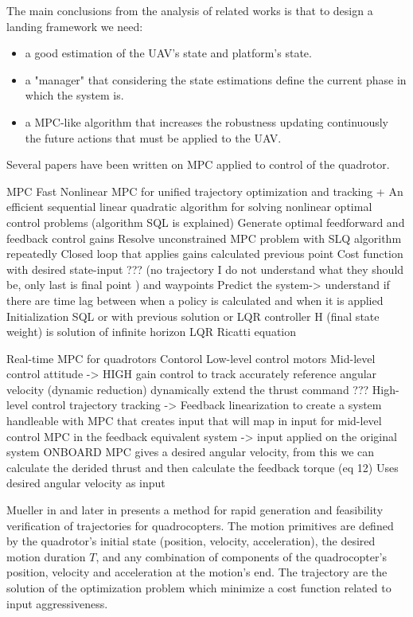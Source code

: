 The main conclusions from the analysis of related works is that to design a landing framework we need:
\begin{itemize}
\item a good estimation of the UAV's state and platform's state.
\item a "manager" that considering the state estimations define the current phase in which the system is.
\item a MPC-like algorithm that increases the robustness updating continuously the future actions that must be applied to the UAV.
\end{itemize}



Several papers have been written on MPC \cite{camacho2013model} applied to control of the quadrotor.



MPC
Fast Nonlinear MPC for unified trajectory optimization and tracking 
+
An efficient sequential linear quadratic algorithm for solving nonlinear optimal control problems (algorithm SQL is explained)
Generate optimal feedforward and feedback control gains
Resolve unconstrained MPC problem with SLQ algorithm repeatedly
Closed loop that applies gains calculated previous point
Cost function with desired state-input ??? (no trajectory I do not understand what they should be, only last is final point )  and waypoints
Predict the system-> understand if there are time lag between when a policy is calculated and when it is applied
Initialization SQL or with previous solution or LQR controller 
H (final state weight) is solution of infinite horizon LQR Ricatti equation



Real-time MPC for quadrotors
Contorol
Low-level control motors
Mid-level control attitude -> HIGH gain control to track accurately reference angular velocity (dynamic reduction) dynamically extend the thrust command ???
High-level control trajectory tracking -> Feedback linearization to create a system handleable  with MPC that creates input that will map in input for mid-level control
MPC in the feedback equivalent system -> input applied on the original system
ONBOARD
MPC gives a desired angular velocity, from this we can calculate the derided thrust and then calculate the feedback torque (eq 12)
Uses desired angular velocity as input



Mueller in \cite{mueller2013model} and later in \cite{mueller2015computationally} presents a method for rapid generation and feasibility verification of trajectories for quadrocopters. The motion primitives are defined by the quadrotor's initial state (position, velocity, acceleration), the desired motion duration $T$, and any combination of components of the quadrocopter’s
position, velocity and acceleration at the motion’s end. The trajectory are the solution of the optimization problem which minimize a
cost function related to input aggressiveness.

